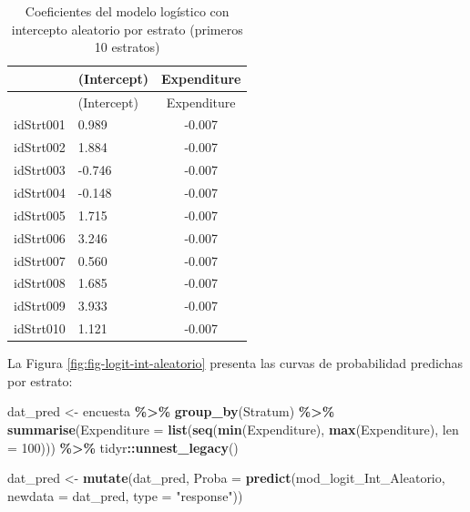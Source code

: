 \documentclass[
  spanish,
  12pt,
]{book}
\newenvironment{Shaded}{\begin{snugshade}}{\end{snugshade}}
\newcommand{\AttributeTok}[1]{\textcolor[rgb]{0.13,0.29,0.53}{#1}}
\newcommand{\DecValTok}[1]{\textcolor[rgb]{0.00,0.00,0.81}{#1}}
\newcommand{\FunctionTok}[1]{\textcolor[rgb]{0.13,0.29,0.53}{\textbf{#1}}}
\newcommand{\NormalTok}[1]{#1}
\newcommand{\OtherTok}[1]{\textcolor[rgb]{0.56,0.35,0.01}{#1}}
\newcommand{\SpecialCharTok}[1]{\textcolor[rgb]{0.81,0.36,0.00}{\textbf{#1}}}
\newcommand{\StringTok}[1]{\textcolor[rgb]{0.31,0.60,0.02}{#1}}
\begin{document}
\begin{longtable}[]{@{}llc@{}}
\caption{\label{tab:tab-coef-logit-int-aleatorio}Coeficientes del modelo logístico con intercepto aleatorio por estrato (primeros 10 estratos)}\tabularnewline
\toprule\noalign{}
& (Intercept) & Expenditure \\
\midrule\noalign{}
\endfirsthead
\toprule\noalign{}
& (Intercept) & Expenditure \\
\midrule\noalign{}
\endhead
\bottomrule\noalign{}
\endlastfoot
idStrt001 & 0.989 & -0.007 \\
idStrt002 & 1.884 & -0.007 \\
idStrt003 & -0.746 & -0.007 \\
idStrt004 & -0.148 & -0.007 \\
idStrt005 & 1.715 & -0.007 \\
idStrt006 & 3.246 & -0.007 \\
idStrt007 & 0.560 & -0.007 \\
idStrt008 & 1.685 & -0.007 \\
idStrt009 & 3.933 & -0.007 \\
idStrt010 & 1.121 & -0.007 \\
\end{longtable}

La Figura \ref{fig:fig-logit-int-aleatorio} presenta las curvas de probabilidad predichas por estrato:

\begin{Shaded}
\begin{Highlighting}[]
\NormalTok{dat\_pred }\OtherTok{\textless{}{-}}\NormalTok{ encuesta }\SpecialCharTok{\%\textgreater{}\%}
  \FunctionTok{group\_by}\NormalTok{(Stratum) }\SpecialCharTok{\%\textgreater{}\%}
  \FunctionTok{summarise}\NormalTok{(}\AttributeTok{Expenditure =} \FunctionTok{list}\NormalTok{(}\FunctionTok{seq}\NormalTok{(}\FunctionTok{min}\NormalTok{(Expenditure), }\FunctionTok{max}\NormalTok{(Expenditure), }\AttributeTok{len =} \DecValTok{100}\NormalTok{))) }\SpecialCharTok{\%\textgreater{}\%}
\NormalTok{  tidyr}\SpecialCharTok{::}\FunctionTok{unnest\_legacy}\NormalTok{()}

\NormalTok{dat\_pred }\OtherTok{\textless{}{-}} \FunctionTok{mutate}\NormalTok{(dat\_pred,}
                   \AttributeTok{Proba =} \FunctionTok{predict}\NormalTok{(mod\_logit\_Int\_Aleatorio,}
                                   \AttributeTok{newdata =}\NormalTok{ dat\_pred,}
                                   \AttributeTok{type =} \StringTok{"response"}\NormalTok{))}
\end{Highlighting}
\end{Shaded}
\end{document}

